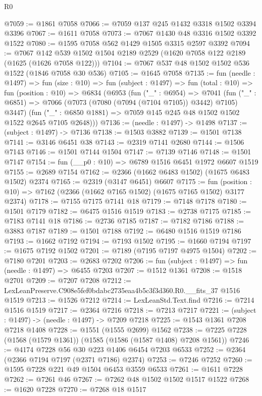 \begin{lexlean}{R0}
\begin{coremodule}
@7059 := @1861 @7058
@7066 := @7059 @137 @245 @1432 @3318 @1502 @3394 @3396
@7067 := @1611 @7058
@7073 := @7067 @1430 @48 @3316 @1502 @3392 @1522
@7080 := @1595 @7058 @562 @1429 @1505 @3315 @2597 @3392
@7094 := @7067 @142 @539 @1502 @1504 @2189 @2529 (@1620 @7058 @122 @2189 (@1625 (@1626 @7058 @122)))
@7104 := @7067 @537 @48 @1502 @1502 @536 @1522 (@1846 @7058 @30 @536)
@7105 := @1645 @7058
@7135 := fun (needle : @1497) =>
  fun (size : @10) =>
  fun (subject : @1497) =>
  fun (total : @10) =>
  fun (position : @10) =>
  @6834
    (@6953
      (fun ("_" : @6954) =>
      @7041
        (fun ("_" : @6851) => @7066 (@7073 (@7080 (@7094 (@7104 @7105)) @3442) @7105) @3447)
        (fun ("_" : @6850 @1881) => @7059 @145 @245 @48 @1502 @1502 @1522 @2645 @7105 @2648)))
@7136 := (needle : @1497) -> @1498
@7137 := (subject : @1497) -> @7136
@7138 := @1503 @3882
@7139 := @1501 @7138
@7141 := @3146 @6451 @38
@7143 := @2319 @7141 @2680
@7144 := @1506 @7143
@7146 := @1501 @7144 @1504
@7147 := @7139 @7146
@7148 := @1501 @7147
@7154 := fun (__p0 : @10) => @6789 @1516 @6451 @1972 @6607 @1519
@7155 := @2689 @7154
@7162 := @2366 (@1662 @6483 @1502) (@1675 @6483 @1502) @2374
@7165 := @2319 (@3147 @6451) @6607
@7175 := fun (position : @10) => @7162 (@2366 (@1662 @7165 @1502) (@1675 @7165 @1502) @3177 @2374)
@7178 := @7155 @7175 @7141 @18
@7179 := @7148 @7178
@7180 := @1501 @7179
@7182 := @6475 @1516 @1519
@7183 := @2738 @7175
@7185 := @7183 @7141 @18
@7186 := @2736 @7185
@7187 := @7182 @7186
@7188 := @3883 @7187
@7189 := @1501 @7188
@7192 := @6480 @1516 @1519 @7186
@7193 := @1662 @7192
@7194 := @7193 @1502
@7195 := @1660 @7194
@7197 := @1675 @7192 @1502
@7201 := @7189 (@7195 @7197 @4975 @1504)
@7202 := @7180 @7201
@7203 := @2683 @7202
@7206 := fun (subject : @1497) => fun (needle : @1497) => @6455 @7203
@7207 := @1512 @1361
@7208 := @1518 @2701
@7209 := @7207 @7208
@7212 := LexLeanPreserve.C908e5fef0bdabc2735eaa4b5c3f3d360.R0.__fits_37 @1516 @1519
@7213 := @1526 @7212
@7214 := LexLeanStd.Text.find
@7216 := @7214 @1516 @1519
@7217 := @2364 @7216
@7218 := @7213 @7217
@7221 := (subject : @1497) -> (needle : @1497) -> @7209 @7218
@7225 := @1543 @1361 @7208 @7218 @1408
@7228 := @1551 (@1555 @2699) @1562
@7238 := @7225 @7228 (@1568 (@1579 @1361)) (@1585 (@1586 (@1587 @1408) @7208 @1561))
@7246 := @4174 @7228 @56 @30 @223 @1406 @6454 @7203 @6533
@7252 := @2364 (@2366 @7194 @7197 (@2371 @7186) @2374)
@7253 := @7246 @7252
@7260 := @1595 @7228 @221 @49 @1504 @6453 @3559 @6533
@7261 := @1611 @7228
@7262 := @7261 @46
@7267 := @7262 @48 @1502 @1502 @1517 @1522
@7268 := @1620 @7228
@7270 := @7268 @18 @1517

\end{coremodule}
\end{lexlean}
